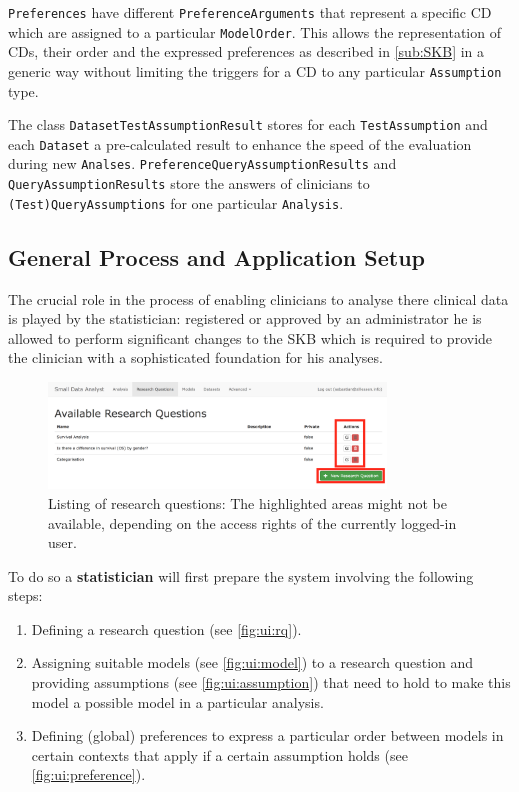 \texttt{Preferences} have different \texttt{PreferenceArguments} that represent a specific \gls{CD} which are assigned to a particular \texttt{ModelOrder}. This allows the representation of \glspl{CD}, their order and the expressed preferences as described in \autoref{sub:SKB} in a generic way without limiting the triggers for a \gls{CD} to any particular \texttt{Assumption} type. 

The class \texttt{DatasetTestAssumptionResult} stores for each \texttt{TestAssumption} and each \texttt{Dataset} a pre-calculated result to enhance the speed of the evaluation during new \texttt{Analses}. \texttt{PreferenceQueryAssumptionResults} and \texttt{QueryAssumptionResults} store the answers of clinicians to \texttt{(Test)QueryAssumptions} for one particular \texttt{Analysis}.


\subsection{General Process and Application Setup}
\label{sub:process}
The crucial role in the process of enabling clinicians to analyse there clinical data is played by the statistician: registered or approved by an administrator he is allowed to perform significant changes to the \gls{SKB} which is required to provide the clinician with a sophisticated foundation for his analyses. 

\begin{figure}[h]
\centering
\includegraphics[width=0.8\textwidth]{figures/ui_RQ}
\caption{Listing of research questions: The highlighted areas might not be available, depending on the access rights of the currently logged-in user.}
\label{fig:ui:rq}
\end{figure}

To do so a \textbf{statistician} will first prepare the system involving the following steps:

\begin{enumerate}
	\item Defining a research question (see \autoref{fig:ui:rq}).
	\item Assigning suitable models (see \autoref{fig:ui:model}) to a research question and providing assumptions (see \autoref{fig:ui:assumption}) that need to hold to make this model a possible model in a particular analysis.
	\item Defining (global) preferences to express a particular order between models in certain contexts that apply if a certain assumption holds (see \autoref{fig:ui:preference}).
\end{enumerate}

